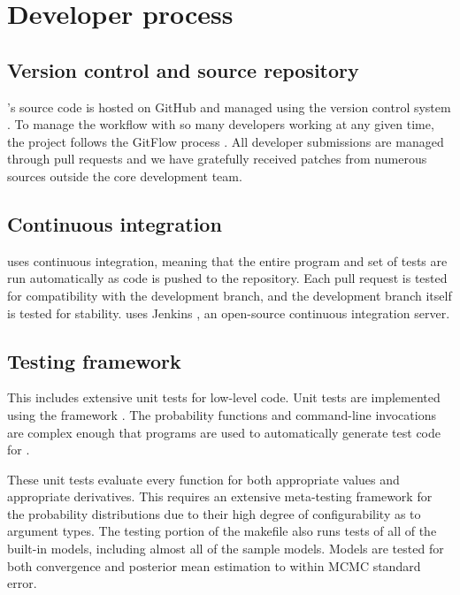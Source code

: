 \documentclass[article]{jss}
\begin{document}
\section{Developer process}

\subsection{Version control and source repository}

's source code is hosted on GitHub and managed using
the  version control system \citep{Chacon:2009}.  To manage
the workflow with so many developers working at any given time, the
project follows the GitFlow process \citep{Driessen:2010}.  All
developer submissions are managed through pull requests and we have
gratefully received patches from numerous sources outside the core
development team.


\subsection{Continuous integration}

 uses continuous integration, meaning that the entire
program and set of tests are run automatically as code is pushed to
the  repository.  Each pull request is tested for
compatibility with the development branch, and the development branch
itself is tested for stability.   uses Jenkins
\citep{Smart:2011}, an open-source continuous integration server.

\subsection{Testing framework}

This includes extensive unit tests for low-level  code.
Unit tests are implemented using the  framework
\citep{GoogleTest:2011}.  The probability functions and command-line
invocations are complex enough that programs are used to automatically
generate test code for .

These unit tests evaluate every function for both appropriate values
and appropriate derivatives.  This requires an extensive meta-testing
framework for the probability distributions due to their high degree
of configurability as to argument types.  The testing portion of the
makefile also runs tests of all of the built-in models, including
almost all of the  sample models.  Models are tested
for both convergence and posterior mean estimation to within MCMC
standard error.
\end{document}
